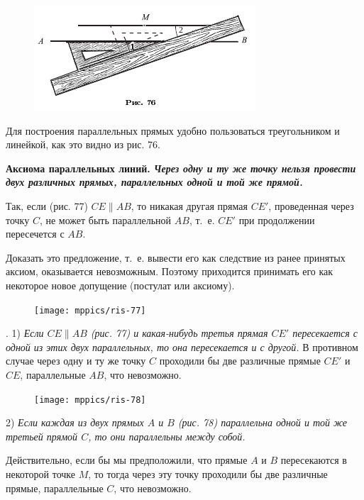 \documentclass[oneside]{book}
\begin{document}
\begin{figure}[h!]
\centering
\includegraphics{pics/ris-76}
\caption{}
\end{figure}

Для построения параллельных прямых удобно пользоваться треугольником и линейкой, как это видно из рис. 76.

\textbf{Аксиома параллельных линий.
\emph{Через одну и ту же точку нельзя провести двух различных прямых, параллельных одной и той же прямой.}}

Так, если (рис. 77) $CE\parallel AB$, то никакая другая прямая $CE'$, проведенная через точку $C$, не может быть параллельной $AB$, т.~е. $CE'$ при продолжении пересечется с $AB$.

Доказать это предложение, т.~е. вывести его как следствие из ранее принятых аксиом, оказывается невозможным.
Поэтому приходится принимать его как некоторое новое допущение (постулат или аксиому).

\begin{figure}
\centering
\texttt{[image: mppics/ris-77]}
\caption{}
\end{figure}

.
1) \emph{Если $CE\parallel AB$ \emph{(рис. 77)} и какая-нибудь третья прямая $CE'$ пересекается с одной из этих двух параллельных, то она пересекается и с другой.}
В противном случае через одну и ту же точку $C$ проходили бы две различные прямые $CE'$ и $CE$, параллельные $AB$, что невозможно.

\begin{figure}
\centering
\texttt{[image: mppics/ris-78]}
\caption{}
\end{figure}

2) \emph{Если каждая из двух прямых $A$ и $B$ \emph{(рис. 78)} параллельна одной и той же третьей прямой $C$, то они параллельны между собой.}

Действительно, если бы мы предположили, что прямые $A$ и $B$ пересекаются в некоторой точке $M$, то тогда через эту точку проходили бы две различные прямые, параллельные $C$, что невозможно.
\end{document}
